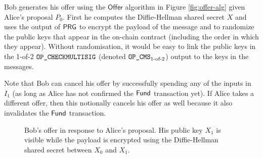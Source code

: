 \documentclass[runningheads]{llncs}
\begin{document}
Bob generates his offer using the $\textsf{Offer}$ algorithm in Figure \ref{fig:offer-alg} given Alice's proposal $P_0$. First he computes the Diffie-Hellman shared secret $X$ and uses the output of $\textsf{PRG}$ to encrypt the payload of the message and to randomize the public keys that appear in the on-chain contract (including the order in which they appear). Without randomisation, it would be easy to link the public keys in the 1-of-2 $\texttt{OP\_CHECKMULTISIG}$\cite{opcheckmultisig} (denoted $\texttt{OP\_CMS}_{\text{1-of-2}}$) output to the keys in the messages.

Note that Bob can cancel his offer by successfully spending any of the inputs in $I_1$ (as long as Alice has not confirmed the $\textsf{Fund}$ transaction yet). If Alice takes a different offer, then this notionally cancels his offer as well because it also invalidates the $\textsf{Fund}$ transaction.

\begin{figure}[!h]
\centering
\caption{Bob's offer in response to Alice's proposal. His public key $X_1$ is visible while the payload is encrypted using the Diffie-Hellman shared secret between $X_0$ and $X_1$.}\label{fig:bob-offer}
\end{figure}
\end{document}

